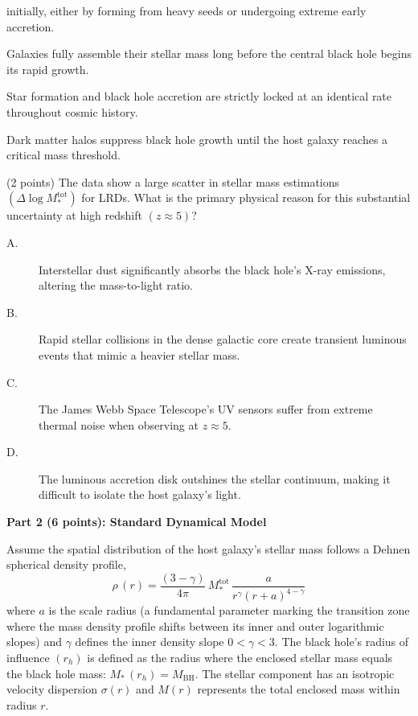 \begin{description}
\begin{description}
\begin{description}
      initially, either by forming from heavy seeds or undergoing extreme early
      accretion.
    \item[B.] Galaxies fully assemble their stellar mass long before the
      central black hole begins its rapid growth.
    \item[C.] Star formation and black hole accretion are strictly locked at an
      identical rate throughout cosmic history.
    \item[D.] Dark matter halos suppress black hole growth until the host
      galaxy reaches a critical mass threshold.
    \end{description}
  \item[(d.2)] (2 points) The data show a large scatter in stellar mass
    estimations $(\Delta\log M_*^{\mathrm{tot}})$ for LRDs. What is the primary
    physical reason for this substantial uncertainty at high redshift
    $(z \approx 5)$?
    \begin{description}
    \item[A.] Interstellar dust significantly absorbs the black hole's X-ray
      emissions, altering the mass-to-light ratio.
    \item[B.] Rapid stellar collisions in the dense galactic core create
      transient luminous events that mimic a heavier stellar mass.
    \item[C.] The James Webb Space Telescope's UV sensors suffer from extreme
      thermal noise when observing at $z \approx 5$.
    \item[D.] The luminous accretion disk outshines the stellar continuum,
      making it difficult to isolate the host galaxy's light.
    \end{description}
  \end{description}
\end{description}

\medskip\noindent\textbf{Part 2 (6 points): Standard Dynamical Model}

Assume the spatial distribution of the host galaxy's stellar mass follows a
Dehnen spherical density profile,
\[
\rho\,(r) = \frac{(3-\gamma)}{4\pi}\, M_*^{\mathrm{tot}}\,
  \frac{a}{r^{\gamma}(r+a)^{4-\gamma}}
\]
where $a$ is the scale radius (a fundamental parameter marking the transition
zone where the mass density profile shifts between its inner and outer
logarithmic slopes) and $\gamma$ defines the inner density slope
$0 < \gamma < 3$. The black hole's radius of influence $(r_h)$ is defined as
the radius where the enclosed stellar mass equals the black hole mass:
$M_*\,(r_h) = M_{\mathrm{BH}}$. The stellar component has an isotropic velocity
dispersion $\sigma(r)$ and $M(r)$ represents the total enclosed mass within
radius $r$.

